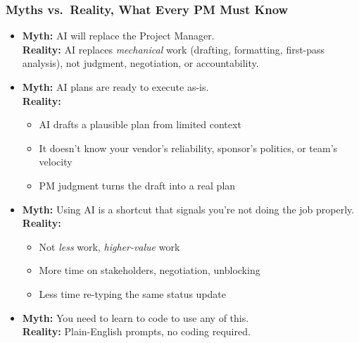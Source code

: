\begin{frame}[fragile]\frametitle{Myths vs.\ Reality, What Every PM Must Know}

\begin{itemize}
  \item \textbf{Myth:} AI will replace the Project Manager.\\
    \textbf{Reality:} AI replaces \textit{mechanical} work (drafting, formatting, first-pass analysis), not judgment, negotiation, or accountability.

  \item \textbf{Myth:} AI plans are ready to execute as-is.\\
    \textbf{Reality:}
    \begin{itemize}
      \item AI drafts a plausible plan from limited context
      \item It doesn't know your vendor's reliability, sponsor's politics, or team's velocity
      \item PM judgment turns the draft into a real plan
    \end{itemize}

  \item \textbf{Myth:} Using AI is a shortcut that signals you're not doing the job properly.\\
    \textbf{Reality:}
    \begin{itemize}
      \item Not \textit{less} work, \textit{higher-value} work
      \item More time on stakeholders, negotiation, unblocking
      \item Less time re-typing the same status update
    \end{itemize}

  \item \textbf{Myth:} You need to learn to code to use any of this.\\
    \textbf{Reality:} Plain-English prompts, no coding required.
\end{itemize}

\end{frame}

